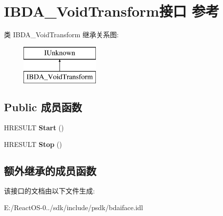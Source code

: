 \hypertarget{interface_i_b_d_a___void_transform}{}\section{I\+B\+D\+A\+\_\+\+Void\+Transform接口 参考}
\label{interface_i_b_d_a___void_transform}
类 I\+B\+D\+A\+\_\+\+Void\+Transform 继承关系图\+:\begin{figure}[H]
\begin{center}
\leavevmode
\includegraphics[height=2.000000cm]{interface_i_b_d_a___void_transform}
\end{center}
\end{figure}
\subsection*{Public 成员函数}
\begin{DoxyCompactItemize}
\item 
\mbox{\label{interface_i_b_d_a___void_transform_a67d6bfbb6c2b2057317d463ba96f579d}} 
H\+R\+E\+S\+U\+LT {\bfseries Start} ()
\item 
\mbox{\label{interface_i_b_d_a___void_transform_a40e940fc3929a47870da41c5e351a6df}} 
H\+R\+E\+S\+U\+LT {\bfseries Stop} ()
\end{DoxyCompactItemize}
\subsection*{额外继承的成员函数}


该接口的文档由以下文件生成\+:\begin{DoxyCompactItemize}
\item 
E\+:/\+React\+O\+S-\/0../sdk/include/psdk/bdaiface.\+idl\end{DoxyCompactItemize}

